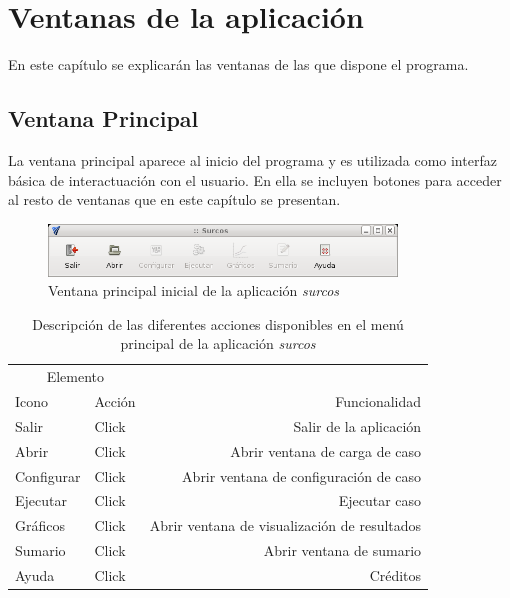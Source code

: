 \chapter{Ventanas de la aplicación}

En este capítulo se explicarán las ventanas de las que dispone el programa.

\section{Ventana Principal}

La ventana principal aparece al inicio del programa y es utilizada como interfaz básica de interactuación con el usuario. En ella se incluyen botones para acceder al resto de ventanas que en este capítulo se presentan.\\

\begin{figure}[!h]
\begin{center}
\includegraphics*[height=1.4cm]{images/mprincipal.png}
\caption{Ventana principal inicial de la aplicación \emph{surcos}}\label{mainWindow}
\end{center}
\end{figure}

\begin{table}[h]\footnotesize
\begin{center}
\begin{tabular}{llr}
\hline
\multicolumn{2}{c}{Elemento} \\
\cline{1-2}
Icono & Acción & Funcionalidad \\
\hline
Salir & Click & Salir de la aplicación\\
Abrir & Click & Abrir ventana de carga de caso \\
Configurar & Click & Abrir ventana de configuración de caso \\
Ejecutar & Click & Ejecutar caso \\
Gráficos & Click & Abrir ventana de visualización de resultados  \\
Sumario & Click & Abrir ventana de sumario \\
Ayuda & Click & Créditos \\
\hline
\end{tabular}
\end{center}
  \caption{Descripción de las diferentes acciones disponibles en el menú principal de la aplicación \emph{surcos}}\label{mainWindowIcons}
\end{table}

